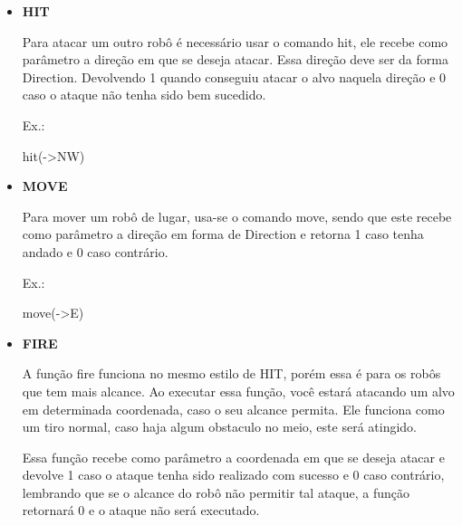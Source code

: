 \documentclass[a4paper]{article}
\begin{document}
{{{{{\begin{itemize}
            \textcolor{NavyBlue}{Ex.:}
        
            my c = toCoord(ask("position"));
        
        \bigskip
        
        \item \textbf{HIT}
            
            Para atacar um outro robô é necessário 
            usar o comando
            \textcolor{NavyBlue}{hit},
            ele recebe como parâmetro a direção em
            que se deseja atacar. 
            Essa direção deve ser da forma Direction.
            Devolvendo 1 quando conseguiu atacar o
            alvo naquela direção e 0 caso o ataque
            não tenha sido bem sucedido.
            
            \textcolor{NavyBlue}{Ex.:}
            
            hit(->NW)

        \bigskip
        
        \item \textbf{MOVE}
            
            Para mover um robô de lugar, usa-se o comando
            \textcolor{NavyBlue}{move},
            sendo que este recebe como parâmetro a direção
            em forma de Direction e retorna 1 caso
            tenha andado e 0 caso contrário.
                
            \textcolor{NavyBlue}{Ex.:}

            move(->E)
            
        \bigskip

        \item \textbf{FIRE}
            
            A função 
            \textcolor{NavyBlue}{fire}
            funciona no mesmo estilo de HIT,
            porém essa é para os robôs que tem mais alcance.
            Ao executar essa função, você estará atacando um
            alvo em determinada coordenada, caso o seu alcance
            permita.
            Ele funciona como um tiro normal, caso haja algum
            obstaculo no meio, este será atingido.
            
            Essa função recebe como parâmetro a coordenada em
            que se deseja atacar e devolve 1 caso o ataque tenha
            sido realizado com sucesso e 0 caso contrário,
            lembrando que se o alcance do robô não permitir tal 
            ataque, a função retornará 0 e o ataque não será
            executado.
            

\end{itemize}}}}}}
\end{document}
